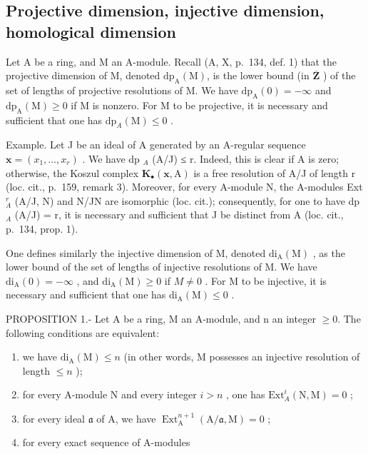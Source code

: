 \subsection{Projective dimension, injective dimension, homological dimension}

Let A be a ring, and M an A-module. Recall (A, X, p.~134, def. 1) that the projective dimension of M, denoted \(\mathrm{dp}_{\mathrm{A}}(\mathrm{M})\), is the lower bound (in \(\overline{\mathbf{Z}}\) ) of the set of lengths of projective resolutions of M. We have \(\mathrm{dp}_{\mathrm{A}}(0) = -\infty\) and \(\mathrm{dp}_{\mathrm{A}}(\mathrm{M}) \geqslant 0\) if M is nonzero. For M to be projective, it is necessary and sufficient that one has \(\mathrm{dp}_{A}(\mathrm{M}) \leqslant 0\) .

Example. Let J be an ideal of A generated by an A-regular sequence \(\mathbf{x} = (x_{1}, \ldots, x_{r})\) . We have dp \(_{A}\) (A/J) ≤ r. Indeed, this is clear if A is zero; otherwise, the Koszul complex \(\mathbf{K}_{\bullet}(\mathbf{x}, \mathrm{A})\) is a free resolution of A/J of length r (loc. cit., p.~159, remark 3). Moreover, for every A-module N, the A-modules Ext \(_{A}^{r}\) (A/J, N) and N/JN are isomorphic (loc. cit.); consequently, for one to have dp \(_{A}\) (A/J) = r, it is necessary and sufficient that J be distinct from A (loc. cit., p.~134, prop. 1).

One defines similarly the injective dimension of M, denoted \(\mathrm{di}_{\mathrm{A}}(\mathrm{M})\) , as the lower bound of the set of lengths of injective resolutions of M. We have \(\mathrm{di}_{\mathrm{A}}(0) = -\infty\) , and \(\mathrm{di}_{\mathrm{A}}(\mathrm{M}) \geqslant 0\) if \(M \neq 0\) . For M to be injective, it is necessary and sufficient that one has \(\mathrm{di}_{\mathrm{A}}(\mathrm{M}) \leqslant 0\) .

PROPOSITION 1.- Let A be a ring, M an A-module, and n an integer \(\geqslant 0\). The following conditions are equivalent:

\begin{enumerate}
\def\labelenumi{(\roman{enumi})}
\item
  we have \(\mathrm{di}_{\mathrm{A}}(\mathrm{M}) \leqslant n\) (in other words, M possesses an injective resolution of length \(\leqslant n\) );
\item
  for every A-module N and every integer \(i > n\) , one has \(\mathrm{Ext}_A^i (\mathrm{N},\mathrm{M}) = 0\) ;
\item
  for every ideal \(\mathfrak{a}\) of A, we have \(\operatorname{Ext}_{\mathrm{A}}^{n+1}(\mathrm{A}/\mathfrak{a},\mathrm{M})=0\) ;
\item
  for every exact sequence of A-modules
\end{enumerate}

